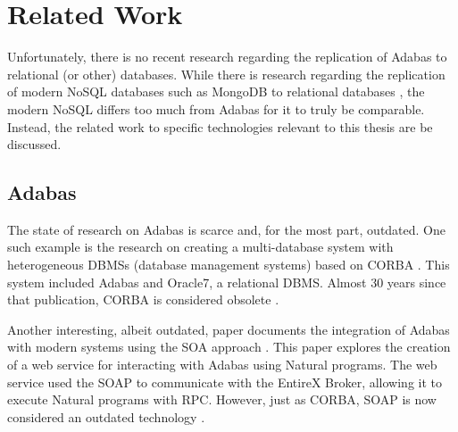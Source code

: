 \chapter{Related Work}
\label{ch03:litreview}
Unfortunately, there is no recent research regarding the replication of Adabas to relational (or other) databases. While there is research regarding the replication of modern NoSQL databases such as MongoDB to relational databases \cite{aftabnosqletltordbms}, the modern NoSQL differs too much from Adabas for it to truly be comparable. Instead, the related work to specific technologies relevant to this thesis are be discussed.

\section{Adabas}
\label{ch03:litreview:adabas}
The state of research on Adabas is scarce and, for the most part, outdated. One such example is the research on creating a multi-database system with heterogeneous DBMSs (database management systems) based on \ac{CORBA} \cite{ozhan1996making}. This system included Adabas and Oracle7, a relational DBMS. Almost 30 years since that publication, \ac{CORBA} is considered obsolete \cite{fallofcorba}.

Another interesting, albeit outdated, paper documents the integration of Adabas with modern systems using the \ac{SOA} approach \cite{koschelmainframemodernization}. This paper explores the creation of a web service for interacting with Adabas using Natural programs. The web service used the \ac{SOAP} to communicate with the EntireX Broker, allowing it to execute Natural programs with \ac{RPC}. However, just as \ac{CORBA}, \ac{SOAP} is now considered an outdated technology \cite{soapoutdated}.


